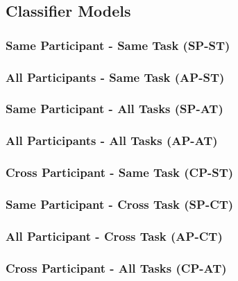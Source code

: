 \documentclass[11pt]{article}
\begin{document}
	\subsection{Classifier Models}
	
		\subsubsection{Same Participant - Same Task (SP-ST)}
		
		\subsubsection{All Participants - Same Task (AP-ST)}
		
		\subsubsection{Same Participant - All Tasks (SP-AT)}
		
		\subsubsection{All Participants - All Tasks (AP-AT)}
		
		\subsubsection{Cross Participant - Same Task (CP-ST)}
		
		\subsubsection{Same Participant - Cross Task (SP-CT)}
		
		\subsubsection{All Participant - Cross Task (AP-CT)}
		
		\subsubsection{Cross Participant - All Tasks (CP-AT)}
		
\end{document}
